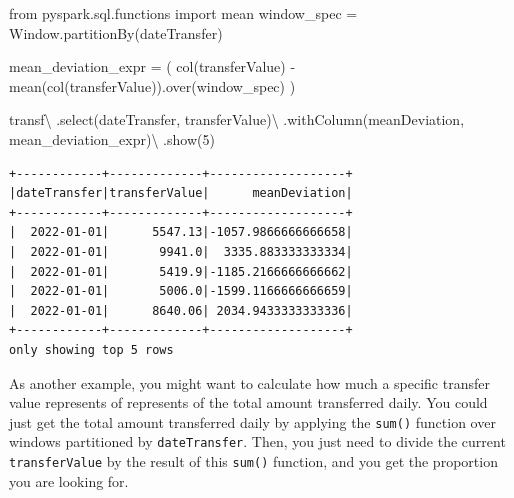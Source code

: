 \documentclass[
  11pt,
  letterpaper,
  DIV=11,
  numbers=noendperiod]{scrreprt}
\newenvironment{Shaded}{\begin{snugshade}}{\end{snugshade}}
\newcommand{\DecValTok}[1]{\textcolor[rgb]{0.68,0.00,0.00}{#1}}
\newcommand{\ImportTok}[1]{\textcolor[rgb]{0.00,0.46,0.62}{#1}}
\newcommand{\NormalTok}[1]{\textcolor[rgb]{0.00,0.23,0.31}{#1}}
\newcommand{\OperatorTok}[1]{\textcolor[rgb]{0.37,0.37,0.37}{#1}}
\newcommand{\StringTok}[1]{\textcolor[rgb]{0.13,0.47,0.30}{#1}}
\begin{document}
\begin{Shaded}
\begin{Highlighting}[]
\ImportTok{from}\NormalTok{ pyspark.sql.functions }\ImportTok{import}\NormalTok{ mean}
\NormalTok{window\_spec }\OperatorTok{=}\NormalTok{ Window.partitionBy(}\StringTok{\textquotesingle{}dateTransfer\textquotesingle{}}\NormalTok{)}

\NormalTok{mean\_deviation\_expr }\OperatorTok{=}\NormalTok{ (}
\NormalTok{    col(}\StringTok{\textquotesingle{}transferValue\textquotesingle{}}\NormalTok{)}
    \OperatorTok{{-}}\NormalTok{ mean(col(}\StringTok{\textquotesingle{}transferValue\textquotesingle{}}\NormalTok{)).over(window\_spec)}
\NormalTok{)}

\NormalTok{transf}\OperatorTok{\textbackslash{}}
\NormalTok{    .select(}\StringTok{\textquotesingle{}dateTransfer\textquotesingle{}}\NormalTok{, }\StringTok{\textquotesingle{}transferValue\textquotesingle{}}\NormalTok{)}\OperatorTok{\textbackslash{}}
\NormalTok{    .withColumn(}\StringTok{\textquotesingle{}meanDeviation\textquotesingle{}}\NormalTok{, mean\_deviation\_expr)}\OperatorTok{\textbackslash{}}
\NormalTok{    .show(}\DecValTok{5}\NormalTok{)}
\end{Highlighting}
\end{Shaded}

\begin{verbatim}
+------------+-------------+-------------------+
|dateTransfer|transferValue|      meanDeviation|
+------------+-------------+-------------------+
|  2022-01-01|      5547.13|-1057.9866666666658|
|  2022-01-01|       9941.0|  3335.883333333334|
|  2022-01-01|       5419.9|-1185.2166666666662|
|  2022-01-01|       5006.0|-1599.1166666666659|
|  2022-01-01|      8640.06| 2034.9433333333336|
+------------+-------------+-------------------+
only showing top 5 rows
\end{verbatim}

As another example, you might want to calculate how much a specific
transfer value represents of represents of the total amount transferred
daily. You could just get the total amount transferred daily by applying
the \texttt{sum()} function over windows partitioned by
\texttt{dateTransfer}. Then, you just need to divide the current
\texttt{transferValue} by the result of this \texttt{sum()} function,
and you get the proportion you are looking for.
\end{document}
